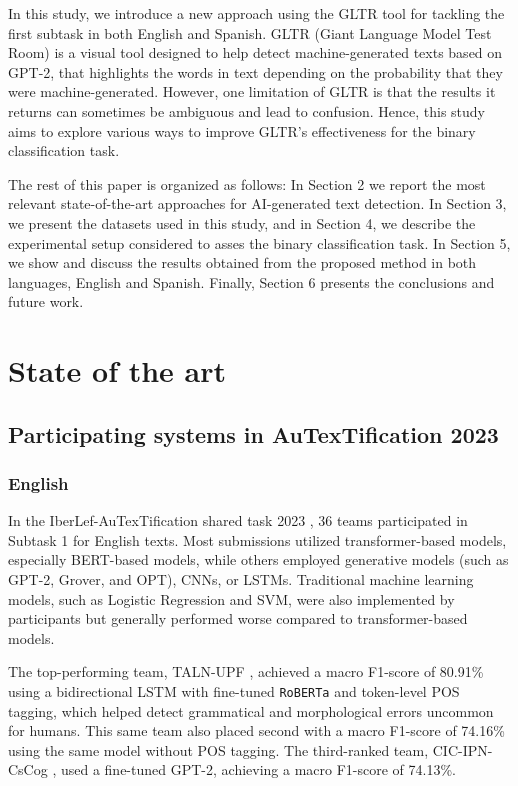 \documentclass[a4paper,11pt,twocolumn,twoside]{article}
\begin{document}
In this study, we introduce a new approach using the GLTR tool \cite{gehrmann-etal-2019-gltr} for tackling the first subtask in both English and Spanish. GLTR (Giant Language Model Test Room) is a visual tool designed to help detect machine-generated texts based on GPT-2, that highlights the words in text depending on the probability that they were machine-generated. However, one limitation of GLTR is that the results it returns can sometimes be ambiguous and lead to confusion. Hence, this study aims to explore various ways to improve GLTR's effectiveness for the binary classification task.

The rest of this paper is organized as follows: 
In Section 2 we report the most relevant state-of-the-art approaches for AI-generated text detection. In Section 3, we present the datasets used in this study, and in Section 4, we describe the experimental setup considered to asses the binary classification task. In Section 5, we show and discuss the results obtained from the proposed method in both languages, English and Spanish. Finally, Section 6 presents the conclusions and future work.

\section{State of the art}
\subsection{Participating systems in AuTexTification 2023} \label{sec:autextification2023}

\subsubsection{English}
In the IberLef-AuTexTification shared task 2023 \cite{autextification}, 36 teams participated in Subtask 1 for English texts. Most submissions utilized transformer-based models, especially BERT-based models, while others employed generative models (such as GPT-2, Grover, and OPT), CNNs, or LSTMs. Traditional machine learning models, such as Logistic Regression and SVM, were also implemented by participants but generally performed worse compared to transformer-based models.

The top-performing team, TALN-UPF \cite{taln-upf2023bilstm}, achieved a macro F1-score of 80.91\% using a bidirectional LSTM with fine-tuned \texttt{RoBERTa} and token-level POS tagging, which helped detect grammatical and morphological errors uncommon for humans. This same team also placed second with a macro F1-score of 74.16\% using the same model without POS tagging. The third-ranked team, CIC-IPN-CsCog \cite{cic-ipn-cscog2023gpt}, used a fine-tuned GPT-2, achieving a macro F1-score of 74.13\%.
\end{document}
